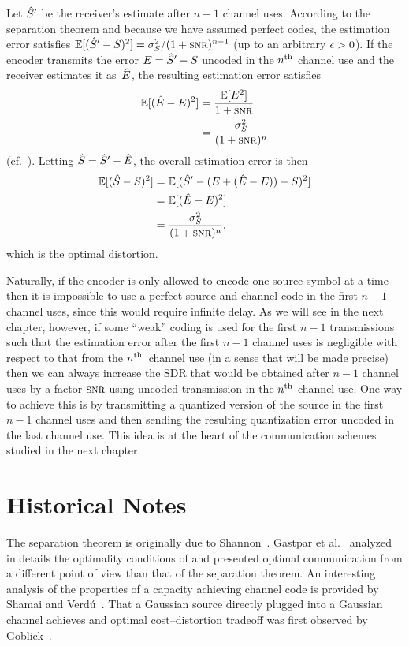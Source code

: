 Let ${\hat{S}}'$ be the receiver's estimate after $n-1$ channel uses. According to the
separation theorem and because we have assumed perfect codes,
the estimation error satisfies $\E[(\Sh' - S)^2] = \ssq / (1 + \snr)^{n-1}$ (up
to an arbitrary $\epsilon > 0$). If the encoder transmits the error $E = {\hat{S}}' - S$
uncoded in the $n{^{\text{th}}}$ channel use and the receiver estimates it as~$\hat{E}$, the
resulting estimation error satisfies
\begin{align*}
  \E[(\Eh - E)^2] &= \frac{\E[E^2]}{ 1 + \snr } \\
  &= \frac{\ssq}{(1 + \snr)^n}
\end{align*}
(cf.~).
Letting ${\hat{S}} = {\hat{S}}' - \hat{E}$, the overall estimation error is then 
\begin{align*}
  \E[(\Sh - S)^2] &= \E[(\Sh' - (E + (\Eh - E)) - S)^2] \\
  &= \E[(\Eh - E)^2] \\
  &= \frac{\ssq}{(1 + \snr)^n},
\end{align*}
which is the optimal distortion. 

Naturally, if the encoder is only allowed to encode one source symbol at a time
then it is impossible to use a perfect source and channel code in the first
$n-1$ channel uses, since this would require infinite delay. As we will see in
the next chapter, however, if some ``weak'' coding is used for the first $n-1$
transmissions such that the estimation error after the first $n-1$ channel uses
is negligible with respect to that from the $n{^{\text{th}}}$~channel use (in a sense that
will be made precise) then we can always increase the SDR that
would be obtained after $n-1$ channel uses by a factor $\snr$ using uncoded
transmission in the $n{^{\text{th}}}$ channel use. One way to achieve this is by
transmitting a quantized version of the source in the first $n-1$ channel uses
and then sending the resulting quantization error uncoded in the last channel
use. This idea is at the heart of the communication schemes studied in the next
chapter.


\section{Historical Notes}

The separation theorem is originally due to Shannon~\cite{Shannon1948}. Gastpar
et al.~\cite{GastparRV2003} analyzed in details the optimality conditions of
 and presented optimal communication from a
different point of view than that of the separation theorem. An interesting
analysis of the properties of a capacity achieving channel code is provided by
Shamai and Verd\'u~\cite{ShamaiV1997}. That a Gaussian source directly plugged
into a Gaussian channel achieves and optimal cost--distortion tradeoff was first
observed by Goblick~\cite{Goblick1965}.

